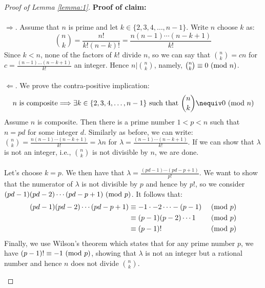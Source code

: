 
% 

\begin{proof}[Proof of Lemma \ref{lemma:1}]

\textbf{Proof of claim:}\\
\\
$\Longrightarrow$. Assume that $n$ is prime and let $k\in\{2,3,4, \dots, n-1\}$. 
Write $n$ choose $k$ as:
\begin{equation*}
    \binom{n}{k} = \frac{n!}{k!(n-k)!} = \frac{n(n-1)\cdots(n-k+1)}{k!}
\end{equation*}
Since $k<n$, none of the factors of $k!$ divide $n$, so we can say that $\binom{n}{k} = cn$ for $c = \frac{(n-1)...(n-k+1)}{k!}$ an integer.
Hence $n | \binom{n}{k}$, namely, $\binom{n}{k}\equiv 0 \ (\mathrm{mod}\ n)$.
\\
\\
$\Longleftarrow$. We prove the contra-positive implication:
\begin{equation*}
    n\text{ is composite}\Longrightarrow\exists k\in\{2,3,4,\dots,n-1\} \text{ such that } \binom{n}{k}\nequiv 0 \Mod n
\end{equation*}
Assume $n$ is composite. Then there is a prime number $1<p<n$ such that $n=pd$ for some integer $d$. Similarly as before, we can write:
$\binom{n}{k}=\frac{n(n-1)\cdots(n-k+1)}{k!}= \lambda n$ for $\lambda = \frac{(n-1)\cdots(n-k+1)}{k!}$.
If we can show that $\lambda$ is not an integer, i.e., $\binom{n}{k}$ is not divisible by $n$, we are done.\\
\\
Let's choose $k=p$.
We then have that $\lambda = \frac{(pd-1)\cdots(pd-p+1)}{p!}$.
We want to show that the numerator of $\lambda$ is not divisible by $p$ and hence by $p!$, so we consider $(pd-1)(pd-2)\cdots(pd-p+1)\ (\mathrm{mod}\ p)$.
It follows that:
\begin{align*}
    (pd-1)(pd-2)\cdots(pd-p+1)
    & \equiv -1\cdot-2\cdots-(p-1)
    && \ (\mathrm{mod}\ p)
    \\ & \equiv (p-1)(p-2)\cdots1
    && \ (\mathrm{mod}\ p)
    \\ & \equiv (p-1)!\,
    && \ (\mathrm{mod}\ p)
\end{align*}
Finally, we use Wilson's theorem which states that for any prime number $p$, we have $(p-1)!\equiv-1\ (\mathrm{mod}\ p)$, showing that $\lambda$ is not an integer but a rational number and hence $n$ does not divide $\binom{n}{k}$.

\cite[p4]{AGranville_2004}

\end{proof}
